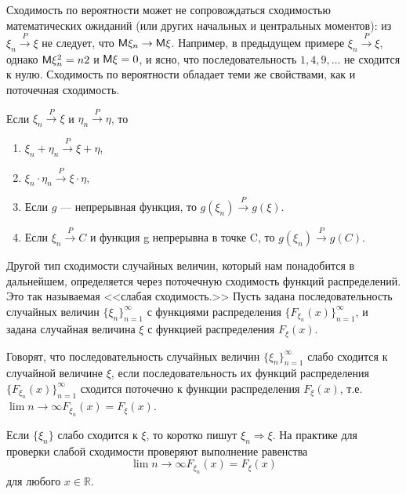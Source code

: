 \begin{remark}\label{rem:21.7}
Сходимость по вероятности может не сопровождаться сходимостью математических ожиданий (или других начальных и
центральных моментов): 
из $\xi_n\stackrel{P}{\to} \xi$ не следует, что $\mathsf{M}\xi_n \to \mathsf{M}\xi$. Например,
в предыдущем примере $\xi_n
\stackrel{P}{\to} \xi$, однако $\mathsf{M}\xi_n^2 = n2$ и $\mathsf{M}\xi = 0$, и ясно, что
последовательность $1, 4, 9, \dots$ не сходится к нулю.
Сходимость по вероятности обладает теми же свойствами, как и поточечная сходимость.
\end{remark}

\begin{theorem}
	Если $\xi_n \stackrel{P}{\to} \xi$ и $\eta_n\stackrel{P}{\to} \eta$, то
	\begin{enumerate}
		\item  $\xi_n + \eta_n\stackrel{P}{\to} \xi + \eta$,
		\item $\xi_n \cdot \eta_n\stackrel{P}{\to} \xi \cdot \eta$,
		\item Если $g$ — непрерывная функция, то $g(\xi_n) \stackrel{P}{\to} g(\xi)$.
		\item Если $\xi_n \stackrel{P}{\to} C$ и функция g непрерывна в точке C, то $g(\xi_n) \stackrel{P}{\to} g(C)$.
	\end{enumerate}
\end{theorem}

Другой тип сходимости случайных величин, который нам понадобится
в дальнейшем, определяется через поточечную сходимость функций распределений. Это так называемая <<слабая сходимость.>> Пусть задана последовательность случайных величин $\{\xi_n\}_{n=1}^{\infty}$ с функциями распределения $\{F_{\xi_n}(x)\}_{n=1}^{\infty}$, и задана случайная величина $\xi$ с функцией распределения $F_\xi(x)$.

\begin{definition}
	Говорят, что последовательность случайных величин $\{\xi_n\}_{n=1}^{\infty}$ слабо сходится к случайной величине $\xi$, если последовательность их функций распределения $\{F_{\xi_n}(x)\}^{\infty}_{n=1}$ сходится поточечно к функции распределения $F_\xi(x)$, т.е. $\lim\limits{n\to\infty}
	F_{\xi_n}(x) = F_\xi(x)$.

Если $\{\xi_n\}$ слабо сходится к $\xi$, то коротко пишут $\xi_n \Rightarrow \xi$. На практике для проверки слабой сходимости проверяют выполнение равенства
$$\lim \limits{n\to\infty} F_{\xi_n}(x) = F_\xi(x)$$ для любого $x \in \mathbb{R}$.
\end{definition}

